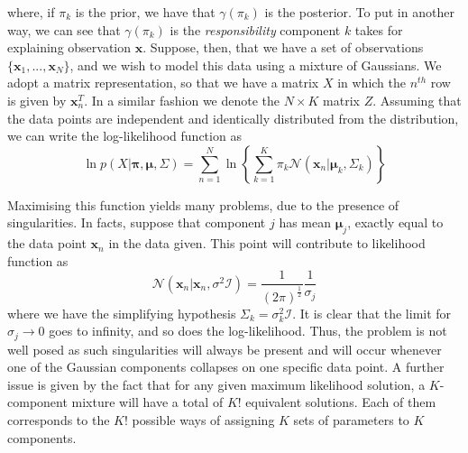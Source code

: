 \documentclass[a4paper]{article}
\begin{document}
 	where, if $\pi_{k}$ is the prior, we have that $\gamma(\pi_{k})$ is the posterior. To put in another way, we can see that $\gamma(\pi_{k})$ is the \textit{responsibility} component $k$ takes for explaining observation $\boldsymbol{x}$.
 	Suppose, then, that we have a set of observations $\{ \boldsymbol{x}_{1}, ..., \boldsymbol{x}_{N} \} $, and we wish to model this data using a mixture of Gaussians. We adopt a matrix representation, so that we have a matrix $X$ in which the $n^{th}$ row is given by $\boldsymbol{x}_{n}^{T}$. In a similar fashion we denote the $N \times K$ matrix $Z$. Assuming that the data points are independent and identically distributed from the distribution, we can write the log-likelihood function as
 	\begin{equation}\label{eqn::log_lik}
 	\ln p \left( X | \boldsymbol{\pi}, \boldsymbol{\mu}, \Sigma \right)
 	= \sum_{n=1}^{N} \ln \left\{ \sum_{k=1}^{K} \pi_{k} \mathcal{N} \left( \boldsymbol{x}_{n} | \boldsymbol{\mu}_{k}, \Sigma_{k} \right) \right\}
 	\end{equation}

 	Maximising this function yields many problems, due to the presence of singularities. In facts, suppose that component $j$ has mean $\boldsymbol{\mu}_{j}$, exactly equal to the data point $\boldsymbol{x}_{n}$ in the data given. This point will contribute to likelihood function as
 	\begin{equation*}
 	\mathcal{N} \left( \boldsymbol{x}_{n} | \boldsymbol{x}_{n}, \sigma^{2} \mathcal{I} \right)
 	= \frac{1}{ \left(2 \pi \right)^{\frac{1}{2}}} \frac{1}{\sigma_{j}}
 	\end{equation*}
 	where we have the simplifying hypothesis $\Sigma_{k} = \sigma_{k}^{2} \mathcal{I}$. It is clear that the limit for $\sigma_{j} \to 0$ goes to infinity, and so does the log-likelihood. Thus, the problem is not well posed as such singularities will always be present and will occur whenever one of the Gaussian components collapses on one specific data point.
 	A further issue is given by the fact that for any given maximum likelihood solution, a $K$-component mixture will have a total of $K!$ equivalent solutions. Each of them corresponds to the $K!$ possible ways of assigning $K$ sets of parameters to $K$ components.
\end{document}
